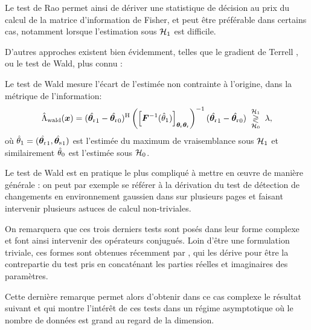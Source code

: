 Le test de Rao permet ainsi de dériver une statistique de décision au prix du calcul de la matrice d'information de Fisher, et peut être préférable dans certains cas, notamment lorsque l'estimation sous $\mathcal{H}_1$ est difficile.


D'autres approches existent bien évidemment, telles que le gradient de Terrell \cite{terrell2002gradient}, ou le test de Wald, plus connu :

\begin{definition}
\label{def:detection-wald}
  Le test de Wald mesure l'écart de l'estimée non contrainte à l'origine, dans la métrique de l'information:
  \begin{equation}
    \hat{\Lambda}_{\mathrm{wald}}(\boldsymbol{x})
    =
  (\hat{\boldsymbol{\theta}_{\mathrm{r}}}_1 - \hat{\boldsymbol{\theta}_{\mathrm{r}}}_0)^{\mathrm{H}}
    \left(\left[{\boldsymbol{F}}^{-1}(\hat{\theta}_1)\right]_{\boldsymbol{\theta}_{\mathrm{r}}\boldsymbol{\theta}_{\mathrm{r}}}\right)^{-1}
    (\hat{\boldsymbol{\theta}_{\mathrm{r}}}_1 - \hat{\boldsymbol{\theta}_{\mathrm{r}}}_0)
    \;\underset{\mathcal{H}_0}{\overset{\mathcal{H}_1}{\gtrless}}\; \lambda,
    \label{eq:detection-wald}
  \end{equation}
  où $\hat{\theta}_1=(\hat{\boldsymbol{\theta}_{\mathrm{r}}}_1,\hat{\boldsymbol{\theta}_{\mathrm{s}}}_1)$ est l'estimée du maximum de vraisemblance sous $\mathcal{H}_1$ et similairement $\hat{\theta}_0$ est l'estimée sous $\mathcal{H}_0$.
\end{definition}

Le test de Wald est en pratique le plus compliqué à mettre en œuvre de manière générale : on peut par exemple se référer à la dérivation du test de détection de changements en environnement gaussien dans  sur plusieurs pages et faisant intervenir plusieurs astuces de calcul non-triviales.


\begin{remark}
  On remarquera que ces trois derniers tests sont posés dans leur forme complexe et font ainsi intervenir des opérateurs conjugués. Loin d'être une formulation triviale, ces formes sont obtenues récemment par , qui les dérive pour être la contrepartie du test pris en concaténant les parties réelles et imaginaires des paramètres.
\end{remark}


Cette dernière remarque permet alors d'obtenir dans ce cas complexe le résultat suivant et qui montre l'intérêt de ces tests dans un régime asymptotique où le nombre de données est grand au regard de la dimension.

